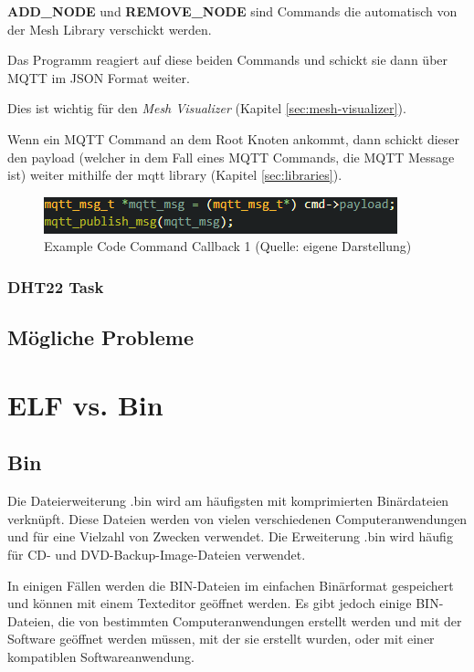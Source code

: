 \textbf{ADD\_NODE} und \textbf{REMOVE\_NODE} sind Commands die automatisch von der Mesh Library verschickt werden.

Das Programm reagiert auf diese beiden Commands und schickt sie dann über MQTT im JSON Format weiter.

Dies ist wichtig für den \textit{Mesh Visualizer} (Kapitel \ref{sec:mesh-visualizer}).

Wenn ein MQTT Command an dem Root Knoten ankommt, dann schickt dieser den payload (welcher in dem Fall eines MQTT Commands, die MQTT Message ist) weiter mithilfe der mqtt library (Kapitel \ref{sec:libraries}).

\begin{figure}[H]
    \begin{center}
        \includegraphics[scale=0.8]{images/example_code_on_cmd_one.png}
        \caption{Example Code Command Callback 1 (Quelle: eigene Darstellung)}
        \label{abb:example_code_on_cmd_one}
    \end{center}
\end{figure}

\subsubsection{DHT22 Task}
\subsection{Mögliche Probleme}

\section{ELF vs. Bin}

\subsection{Bin}
Die Dateierweiterung .bin wird am häufigsten mit komprimierten Binärdateien verknüpft. Diese Dateien werden von vielen verschiedenen Computeranwendungen und für eine Vielzahl von Zwecken verwendet. Die Erweiterung .bin wird häufig für CD- und DVD-Backup-Image-Dateien verwendet.

In einigen Fällen werden die BIN-Dateien im einfachen Binärformat gespeichert und können mit einem Texteditor geöffnet werden. Es gibt jedoch einige BIN-Dateien, die von bestimmten Computeranwendungen erstellt werden und mit der Software geöffnet werden müssen, mit der sie erstellt wurden, oder mit einer kompatiblen Softwareanwendung.\cite{file.org_bin}

